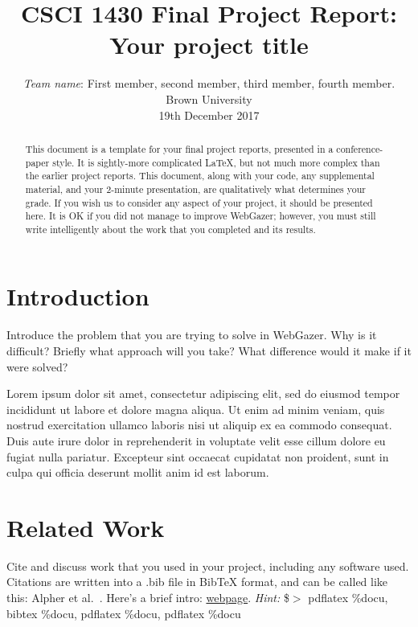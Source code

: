 \documentclass[10pt,twocolumn,letterpaper]{article}
\begin{document}
\title{CSCI 1430 Final Project Report:\\Your project title}

\author{\emph{Team name}: First member, second member, third member, fourth member.\\
Brown University\\
19th December 2017
}

\maketitle

\begin{abstract}
This document is a template for your final project reports, presented in a conference-paper style. It is sightly-more complicated LaTeX, but not much more complex than the earlier project reports. This document, along with your code, any supplemental material, and your 2-minute presentation, are qualitatively what determines your grade. If you wish us to consider any aspect of your project, it should be presented here. It is OK if you did not manage to improve WebGazer; however, you must still write intelligently about the work that you completed and its results.
\end{abstract}

\section{Introduction}

Introduce the problem that you are trying to solve in WebGazer. Why is it difficult? Briefly what approach will you take? What difference would it make if it were solved?

Lorem ipsum dolor sit amet, consectetur adipiscing elit, sed do eiusmod tempor incididunt ut labore et dolore magna aliqua. Ut enim ad minim veniam, quis nostrud exercitation ullamco laboris nisi ut aliquip ex ea commodo consequat. Duis aute irure dolor in reprehenderit in voluptate velit esse cillum dolore eu fugiat nulla pariatur. Excepteur sint occaecat cupidatat non proident, sunt in culpa qui officia deserunt mollit anim id est laborum.

\section{Related Work}

Cite and discuss work that you used in your project, including any software used. Citations are written into a .bib file in BibTeX format, and can be called like this: Alpher et al.~\cite{Alpher04}. Here's a brief intro: \href{http://www.andy-roberts.net/writing/latex/bibliographies}{webpage}. \emph{Hint:} \$$>$ pdflatex \%docu, bibtex \%docu, pdflatex \%docu, pdflatex \%docu
\end{document}
